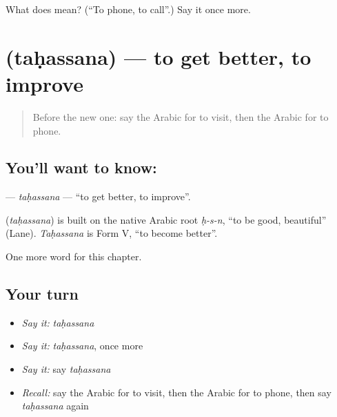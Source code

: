 \begin{tcolorbox}[breakable,colback=teal!4,colframe=teal!35!black,title={Before you move on}]
What does  mean? (\textquotedblleft{}To phone, to call\textquotedblright{}.) Say it once more.
\end{tcolorbox}
\section[\texorpdfstring{\ar{تحسن} (taḥassana)}{تحسن (taḥassana)}]{ (taḥassana) — to get better, to improve}

\label{lesson:AR-C255-tahassana}



\begin{quote}
Before the new one: say the Arabic for to visit, then the Arabic for to phone.
\end{quote}

\subsection*{You'll want to know: }
\textbf{} — \emph{taḥassana} — \textquotedblleft{}to get better, to improve\textquotedblright{}.

\begin{cousinweb}
\textbf{} (\emph{taḥassana}) is built on the native Arabic root \emph{ḥ-s-n}, \textquotedblleft{}to be good, beautiful\textquotedblright{} (Lane). \emph{Taḥassana} is Form V, \textquotedblleft{}to become better\textquotedblright{}.
\end{cousinweb}

\begin{grammarlens}[title={What you've built}]
One more word for this chapter.
\end{grammarlens}

\subsection*{Your turn}
\begin{itemize}
\raggedright
  \item \emph{Say it:} \emph{taḥassana}
  \item \emph{Say it:} \emph{taḥassana}, once more
  \item \emph{Say it:} say \emph{taḥassana}
  \item \emph{Recall:} say the Arabic for to visit, then the Arabic for to phone, then say \emph{taḥassana} again
\end{itemize}

